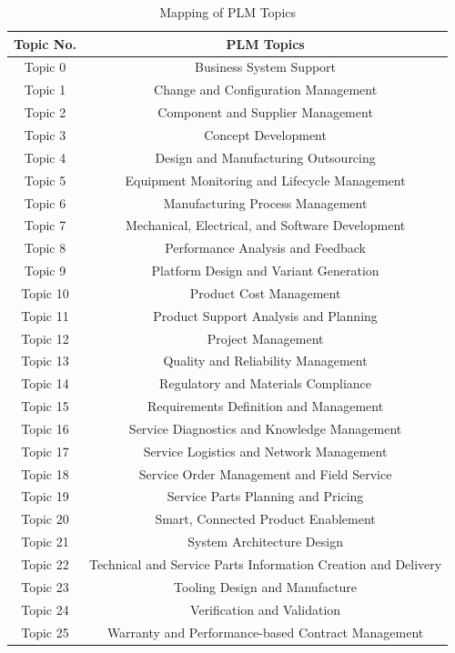\documentclass[senior]{IPSstyle}
\begin{document}
\begin{longtable}{|c|c|}
\caption{Mapping of PLM Topics}\\
\hline
\textbf{Topic No.}&\textbf{PLM Topics}\\
\hline
Topic 0&Business System Support  \\
\hline
Topic 1&Change and Configuration Management \\
\hline
Topic 2&Component and Supplier Management \\
\hline
Topic 3&Concept Development \\
\hline
Topic 4&Design and Manufacturing Outsourcing \\
\hline
Topic 5&Equipment Monitoring and Lifecycle Management \\
\hline
Topic 6&Manufacturing Process Management \\
\hline
Topic 7&Mechanical, Electrical, and Software Development \\
\hline
Topic 8&Performance Analysis and Feedback \\
\hline
Topic 9&Platform Design and Variant Generation \\
\hline
Topic 10&Product Cost Management \\
\hline
Topic 11&Product Support Analysis and Planning \\
\hline
Topic 12&Project Management \\
\hline
Topic 13&Quality and Reliability Management \\
\hline
Topic 14&Regulatory and Materials Compliance \\
\hline
Topic 15&Requirements Definition and Management \\
\hline
Topic 16&Service Diagnostics and Knowledge Management \\
\hline
Topic 17&Service Logistics and Network Management \\
\hline
Topic 18&Service Order Management and Field Service \\
\hline
Topic 19&Service Parts Planning and Pricing \\
\hline
Topic 20&Smart, Connected Product Enablement \\
\hline
Topic 21&System Architecture Design \\
\hline
Topic 22&Technical and Service Parts Information Creation and Delivery\\
\hline
Topic 23&Tooling Design and Manufacture \\
\hline
Topic 24&Verification and Validation \\
\hline
Topic 25&Warranty and Performance-based Contract Management \label{table 5: mapping plm}\\\hline
\end{longtable}
\end{document}
